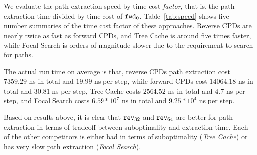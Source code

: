 We evaluate the path extraction speed by time cost \textit{factor},
that is, the path extraction time divided by time cost of ${\tt fwd}_0$.
Table~\ref{tab:speed} shows five number summaries of the time cost factor
of these approaches. Reverse CPDs are nearly twice as fast as
forward CPDs, and Tree Cache is around five times faster, while Focal Search
is orders of magnitude slower due to the requirement to search for paths.

The actual run time on average is that, 
reverse CPDs path extraction cost $7359.29$ ns in total and $19.99$ ns per step,
while forward CPDs cost $14064.18$ ns in total and $30.81$ ns per step,
Tree Cache costs $2564.52$ ns in total and $4.7$ ns per step, and 
Focal Search costs $6.59*10^7$ ns in total and $9.25*10^4$ ns per step.

Based on results above, it is clear that ${\tt rev}_{32}$ and ${\tt
rev}_{64}$ are better for path extraction in terms of tradeoff between
suboptimality and extraction time.  Each of the other competitors is either
bad in terms of suboptimality (\textit{Tree Cache}) or has very slow path
extraction (\textit{Focal Search}).
